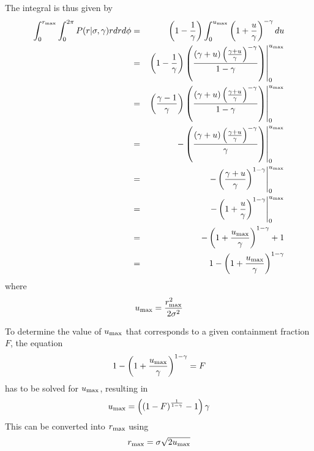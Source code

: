 \documentclass{article}[12pt,a4]
\begin{document}
The integral is thus given by
\begin{eqnarray}
\int_0^{r_{\rm max}} \int_0^{2 \pi} P(r|\sigma, \gamma) r dr d\phi & = &
\left( 1 - \frac{1}{\gamma} \right) \int_0^{u_{\rm max}} 
\left( 1 + \frac{u}{\gamma} \right)^{-\gamma} du \nonumber \\
& = & \left.
\left( 1 - \frac{1}{\gamma} \right)
\left(\frac{(\gamma + u) \left( \frac{ \gamma + u}{\gamma} \right)^{-\gamma}}{1-\gamma} \right) 
\right|_0^{u_{\rm max}} \nonumber \\
& = & \left.
\left( \frac{\gamma-1}{\gamma} \right)
\left(\frac{(\gamma + u) \left( \frac{ \gamma + u}{\gamma} \right)^{-\gamma}}{1-\gamma} \right) 
\right|_0^{u_{\rm max}} \nonumber \\
& = & \left.
-\left(\frac{(\gamma + u) \left( \frac{ \gamma + u}{\gamma} \right)^{-\gamma}}{\gamma} \right) 
\right|_0^{u_{\rm max}} \nonumber \\
& = & \left.
-\left( \frac{ \gamma + u}{\gamma} \right)^{1-\gamma}
\right|_0^{u_{\rm max}} \nonumber \\
& = & \left.
-\left( 1 + \frac{u}{\gamma} \right)^{1-\gamma}
\right|_0^{u_{\rm max}} \nonumber \\
& = & 
-\left( 1 + \frac{u_{\rm max}}{\gamma} \right)^{1-\gamma}
+1 \nonumber \\
& = & 1 - \left( 1 + \frac{u_{\rm max}}{\gamma} \right)^{1-\gamma}
\end{eqnarray}
where
\begin{equation}
u_{\rm max} = \frac{r_{\rm max}^2}{2 \sigma^2}
\end{equation}

To determine the value of $u_{\rm max}$ that corresponds to a given containment fraction $F$,
the equation
\begin{equation}
1 - \left( 1 + \frac{u_{\rm max}}{\gamma} \right)^{1-\gamma} = F
\end{equation}
has to be solved for $u_{\rm max}$, resulting in
\begin{equation}
u_{\rm max} = \left( \left( 1 - F \right)^{\frac{1}{1-\gamma}} - 1 \right) \gamma
\end{equation}
This can be converted into $r_{\rm max}$ using 
\begin{equation}
r_{\rm max} = \sigma \sqrt{ 2 u_{\rm max}}
\end{equation}



\end{document}
